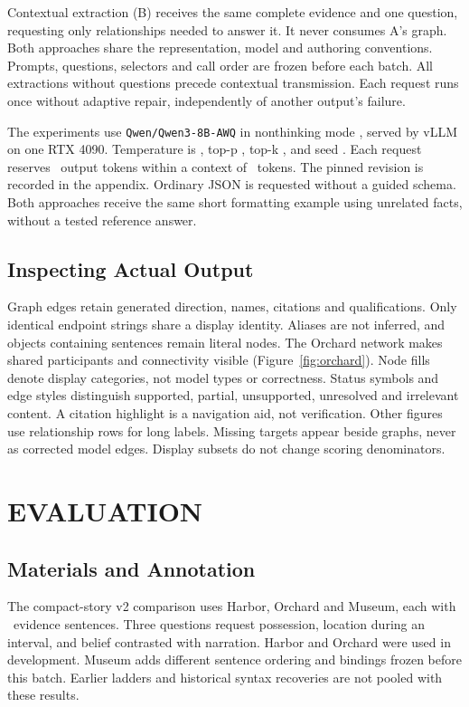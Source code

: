 \documentclass[a4paper,twoside]{article}
\begin{document}
Contextual extraction (B) receives the same complete evidence and one question, requesting only relationships needed to answer it. It never consumes A's graph. Both approaches share the representation, model and authoring conventions. Prompts, questions, selectors and call order are frozen before each batch. All extractions without questions precede contextual transmission. Each request runs once without adaptive repair, independently of another output's failure.

The experiments use \texttt{Qwen/Qwen3-8B-AWQ} in nonthinking mode \cite{qwen2025,qwenmodel}, served by vLLM \cite{kwon2023} on one RTX 4090. Temperature is \Temperature, top-p \TopP, top-k \TopK, and seed \Seed. Each request reserves \OutputTokens\ output tokens within a context of \ContextTokens\ tokens. The pinned revision is recorded in the appendix. Ordinary JSON is requested without a guided schema. Both approaches receive the same short formatting example using unrelated facts, without a tested reference answer.

\subsection{Inspecting Actual Output}
\noindent Graph edges retain generated direction, names, citations and qualifications. Only identical endpoint strings share a display identity. Aliases are not inferred, and objects containing sentences remain literal nodes. The Orchard network makes shared participants and connectivity visible (Figure~\ref{fig:orchard}). Node fills denote display categories, not model types or correctness. Status symbols and edge styles distinguish supported, partial, unsupported, unresolved and irrelevant content. A citation highlight is a navigation aid, not verification. Other figures use relationship rows for long labels. Missing targets appear beside graphs, never as corrected model edges. Display subsets do not change scoring denominators.

\FableFigure
\section{\uppercase{Evaluation}}
\subsection{Materials and Annotation}
\noindent The compact-story v2 comparison uses Harbor, Orchard and Museum, each with \StorySentences\ evidence sentences. Three questions request possession, location during an interval, and belief contrasted with narration. Harbor and Orchard were used in development. Museum adds different sentence ordering and bindings frozen before this batch. Earlier ladders and historical syntax recoveries are not pooled with these results.
\end{document}
